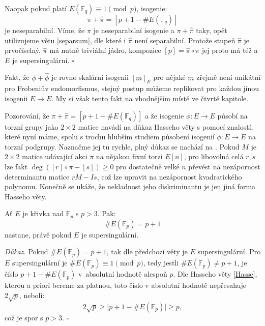 \documentclass[12pt]{report}
\begin{document}
Naopak pokud platí $E(\mathbb{F}_q) \equiv 1 \pmod{p}$, isogenie: $$\pi+\widehat{\pi} = [p+1-\#E(\mathbb{F}_q)]$$ je neseparabilní. Víme, že $\pi$ je neseparabilní isogenie a $\pi+\widehat{\pi}$ taky, opět utilizujeme větu \ref{separsum}, dle které i $\widehat{\pi}$ není separabilní. Protože stupeň $\widehat{\pi}$ je prvočíselný, $\widehat{\pi}$ má nutně triviální jádro, kompozice $[p] = \widehat{\pi} \circ \pi$ jej proto má též a $E$ je supersingulární. \hfill $\square$\\

\begin{poznamka}
Fakt, že $\phi+\widehat{\phi}$ je rovno skalární isogenii $[m]_E$ pro nějaké $m$ zřejmě není unikátní pro Frobeniův endomorfismus, stejný postup můžeme replikovat pro každou jinou isogenii $E \longrightarrow E$. My si však tento fakt  na vhodnějším místě ve čtvrté kapitole. 
\end{poznamka}

\begin{poznamka}
Pozorování, že $\pi+\widehat{\pi} = [p+1-\#E(\mathbb{F}_q)]$ a že isogenie $\phi : E \longrightarrow E$ působí na torzní grupy jako $2 \times 2$ matice navádí na důkaz Hasseho věty s pomocí znalostí, které nyní máme, spolu s trochu hlubším studiem působení isogenií $\phi : E \longrightarrow E$ na torzní podgrupy. Naznačme jej tu rychle, plný důkaz se nachází na \cite[Thm. 8.1, Thm. 7.17]{Sutherland}. Pokud $M$ je $2 \times 2$ matice udávající akci $\pi$ na nějakou fixní torzi $E[n]$, pro libovolná celá $r,s$ lze fakt $\deg ([r] \circ \pi -[s]) \geqslant 0$ pro dostatečně velké $n$ převést na nezápornost determinantu matice $r M - I s$, což lze upravit na nezápornost kvadratického polynomu. Konečně se ukáže, že nekladnost jeho diskriminantu je jen jiná forma Hasseho věty.
\end{poznamka}

\begin{dusledek}\label{super2}
Ať $E$ je křivka nad $\mathbb{F}_p$ s $p > 3$. Pak: $$\# E(\mathbb{F}_p) = p+1$$  nastane, právě pokud $E$ je supersingulární.
\end{dusledek}

\noindent \textit{Důkaz.} Pokud $\# E(\mathbb{F}_p) = p+1$, tak dle předchozí věty je $E$ supersingulární. Pro $E$ supersingulární je $\# E(\mathbb{F}_p) \equiv 1 \pmod{p}$, tedy jestli $\# E(\mathbb{F}_p) \neq p+1$, je číslo $p+1 - \# E(\mathbb{F}_p)$ v~absolutní hodnotě alespoň $p$. Dle Hasseho věty \ref{Hasse}, kterou a priori bereme za platnou, toto číslo v absolutní hodnotě nepřesahuje $2\sqrt{p}$, neboli:
\begin{equation*}
2\sqrt{p} \geqslant \vert p+1 - \# E(\mathbb{F}_p)\vert \geqslant p,
\end{equation*}
což je spor s $p > 3$. \hfill $\square$\\
\end{document}
